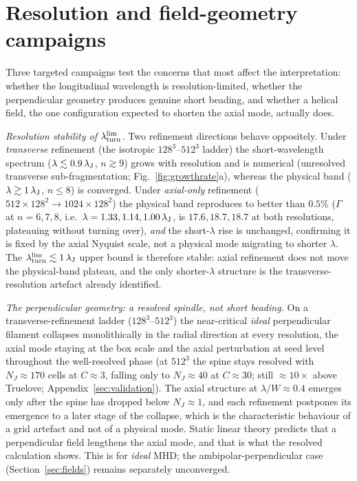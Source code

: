 \documentclass[usenatbib,twoside,twocolumn]{mnras}
\begin{document}
\section{Resolution and field-geometry campaigns}
\label{sec:optional_app}

Three targeted campaigns test the concerns that most affect the interpretation: whether the longitudinal wavelength is resolution-limited, whether the perpendicular geometry produces genuine short beading, and whether a helical field, the one configuration expected to shorten the axial mode, actually does.

\emph{Resolution stability of $\lambda_{\rm turn}^{\rm lim}$.} Two refinement directions behave oppositely. Under \emph{transverse} refinement (the isotropic $128^3$--$512^3$ ladder) the short-wavelength spectrum ($\lambda\lesssim0.9\,\lambda_{\rm J}$, $n\gtrsim9$) grows with resolution and is numerical (unresolved transverse sub-fragmentation; Fig.~\ref{fig:growthrate}a), whereas the physical band ($\lambda\gtrsim1\,\lambda_{\rm J}$, $n\leq8$) is converged. Under \emph{axial-only} refinement ($512\times128^2\to1024\times128^2$) the physical band reproduces to better than $0.5\%$ ($\Gamma$ at $n=6,7,8$, i.e.\ $\lambda=1.33,1.14,1.00\,\lambda_{\rm J}$, is $17.6,18.7,18.7$ at both resolutions, plateauing without turning over), \emph{and} the short-$\lambda$ rise is unchanged, confirming it is fixed by the axial Nyquist scale, not a physical mode migrating to shorter $\lambda$. The $\lambda_{\rm turn}^{\rm lim}\lesssim1\,\lambda_{\rm J}$ upper bound is therefore stable: axial refinement does not move the physical-band plateau, and the only shorter-$\lambda$ structure is the transverse-resolution artefact already identified.

\emph{The perpendicular geometry: a resolved spindle, not short beading.} On a transverse-refinement ladder ($128^3$--$512^3$) the near-critical \emph{ideal} perpendicular filament collapses monolithically in the radial direction at every resolution, the axial mode staying at the box scale and the axial perturbation at seed level throughout the well-resolved phase (at $512^3$ the spine stays resolved with $N_J\approx170$ cells at $C\approx3$, falling only to $N_J\approx40$ at $C\approx30$; still $\approx10\times$ above Truelove; Appendix~\ref{sec:validation}). The axial structure at $\lambda/W\approx0.4$ emerges only after the spine has dropped below $N_J\approx1$, and each refinement postpones its emergence to a later stage of the collapse, which is the characteristic behaviour of a grid artefact and not of a physical mode. Static linear theory predicts that a perpendicular field lengthens the axial mode, and that is what the resolved calculation shows. This is for \emph{ideal} MHD; the ambipolar-perpendicular case (Section~\ref{sec:fields}) remains separately unconverged.
\end{document}
